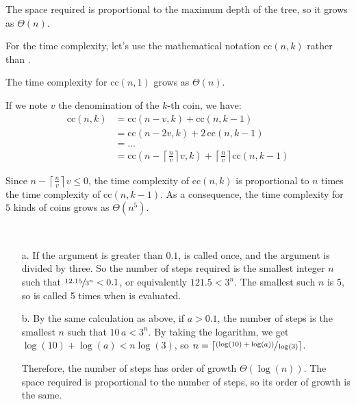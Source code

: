 \begin{exe} %
    The space required is proportional to the maximum depth of the tree, so it 
    grows as $\Theta(n)$.

    For the time complexity, let’s use the mathematical notation $\text{cc}(n, 
    k)$ rather than .

    The time complexity for $\text{cc}(n, 1)$ grows as $\Theta(n)$.

    If we note $v$ the denomination of the $k$-th coin, we have:
    \begin{align*}
        \text{cc}(n, k) &= \text{cc}(n - v, k) + \text{cc}(n, k - 1) \\
                        &= \text{cc}(n - 2v, k) + 2\, \text{cc}(n, k - 1) \\
                        &= … \\
                        &= \text{cc}(n - \left\lceil \frac{n}{v} \right\rceil v, 
                        k) + \left\lceil \frac{n}{v} \right\rceil \text{cc}(n, 
                        k - 1)
    \end{align*}

    Since $n - \left\lceil \frac{n}{v} \right\rceil v \leq 0$, the time 
    complexity of $\text{cc}(n, k)$ is proportional to $n$ times the time 
    complexity of $\text{cc}(n, k - 1)$. As a consequence, the time complexity 
    for $5$ kinds of coins grows as $\Theta(n^5)$.
\end{exe}

\begin{exe} %
    \ \vspace{-20pt}
    \begin{itemize}
        \item[a.] If the argument is greater than $0.1$,  is called 
            once, and the argument is divided by three. So the number of steps 
            required is the smallest integer $n$ such that $\sfrac{12.15}{3^n} 
            < 0.1$, or equivalently $121.5 < 3^n$. The smallest such $n$ is 5, 
            so  is called 5 times when  is evaluated.
        \item[b.] By the same calculation as above, if $a > 0.1$, the number of 
            steps is the smallest $n$ such that $10 \, a < 3^n$. By taking the 
            logarithm, we get $\log(10) + \log(a) < n \log(3)$, so $n 
            = \left\lceil \sfrac{(\log(10) + \log(a))}{\log(3)} \right\rceil$.

            Therefore, the number of steps has order of growth 
            $\Theta(\log(n))$. The space required is proportional to the number 
            of steps, so its order of growth is the same.
    \end{itemize}
\end{exe}


